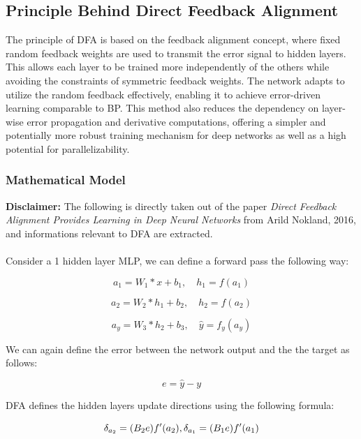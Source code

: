 \documentclass[english]{article}
\begin{document}
\subsection{Principle Behind Direct Feedback Alignment}
The principle of DFA is based on the feedback alignment concept, where fixed random feedback weights are used to transmit the error signal to hidden layers. This allows each layer to be trained more independently of the others while avoiding the constraints of symmetric feedback weights. The network adapts to utilize the random feedback effectively, enabling it to achieve error-driven learning comparable to BP. This method also reduces the dependency on layer-wise error propagation and derivative computations, offering a simpler and potentially more robust training mechanism for deep networks as well as a high potential for parallelizability.

\subsubsection{Mathematical Model}

\textbf{Disclaimer:} The following is directly taken out of the paper \textit{Direct Feedback Alignment Provides Learning in Deep Neural Networks} from Arild Nokland, 2016, and informations relevant to DFA are extracted.
\\\\
Consider a 1 hidden layer MLP, we can define a forward pass the following way:

\begin{equation}
    a_1 = W_1 * x + b_1, \quad h_1 = f(a_1)
\end{equation}

\begin{equation}
    a_2 = W_2 * h_1 + b_2, \quad h_2 = f(a_2)
\end{equation}

\begin{equation}
    a_y = W_3 * h_2 + b_3, \quad \hat{y} = f_y(a_y)
\end{equation}


We can again define the error between the network output and the the target as follows:

\begin{equation}
    e  = \hat{y} - y
\end{equation}


DFA defines the hidden layers update directions using the following formula:

\begin{equation}
    \delta_{a_2} = (B_2 e) f'(a_2), \\
    \delta_{a_1} = (B_1 e) f'(a_1)
\end{equation}
\end{document}
